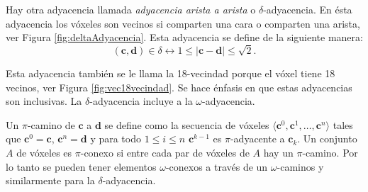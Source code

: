 Hay otra adyacencia llamada \emph{adyacencia arista a arista} o $\delta$-adyacencia. En ésta adyacencia los vóxeles son vecinos si comparten una cara o comparten una arista, ver Figura \ref{fig:deltaAdyacencia}. Esta adyacencia se define de la siguiente manera:
\begin{equation}
(\textbf{c}, \textbf{d}) \in \delta \leftrightarrow 1 \leq |\textbf{c} - \textbf{d}| \leq \sqrt{2}.
\label{ec:adja18}
\end{equation}

Esta adyacencia también se le llama la 18-vecindad porque el vóxel tiene 18 vecinos, ver Figura \ref{fig:vec18vecindad}. Se hace énfasis en que estas adyacencias son inclusivas. La $\delta$-adyacencia incluye a la $\omega$-adyacencia.%

Un $\pi$-camino de $\textbf{c}$ a $\textbf{d}$ se define como la secuencia de vóxeles $\langle \textbf{c}^0, \textbf{c}^1, \ldots, \textbf{c}^n \rangle$ tales que $\textbf{c}^0 = \textbf{c}$, $\textbf{c}^n = \textbf{d}$ y para todo $1 \leq i \leq n$ $\textbf{c}^{k-1}$ es $\pi$-adyacente a $\textbf{c}_{k}$. Un conjunto $A$ de vóxeles es $\pi$-conexo si entre cada par de vóxeles de $A$ hay un $\pi$-camino. Por lo tanto se pueden tener elementos $\omega$-conexos a través de un $\omega$-caminos y similarmente para la $\delta$-adyacencia.

